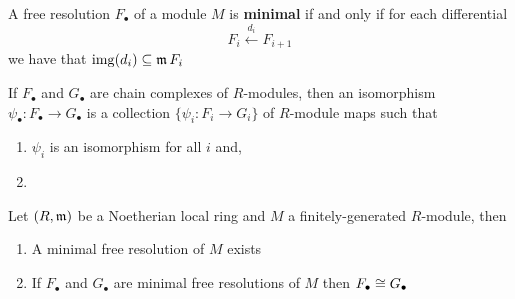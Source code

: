 \documentclass[12pt]{amsart}
\begin{document}
\begin{definition}
    A free resolution $F_\bullet$ of a module $M$ is \textbf{minimal} if and only if for each differential
    \[F_i \xleftarrow{d_i} F_{i+1}\]
    we have that $\operatorname{img}(d_i) \subseteq \operatorname{\mathfrak{m}} F_i$
\end{definition}

\begin{definition}
    If $F_\bullet$ and $G_\bullet$ are chain complexes of $R$-modules, then an isomorphism $\psi_\bullet: F_\bullet \to G_\bullet$ is a collection $\{\psi_i: F_i \to G_i\}$ of $R$-module maps such that 
    \begin{enumerate}
        \item $\psi_i$ is an isomorphism for all $i$ and,
        \item {}
    \end{enumerate}
\end{definition}

\begin{theorem}
    Let $(R, \operatorname{\mathfrak{m}})$ be a Noetherian local ring and $M$ a finitely-generated $R$-module, then
    \begin{enumerate}
        \item A minimal free resolution of $M$ exists 
        \item If $F_\bullet$ and $G_\bullet$ are minimal free resolutions of $M$ then $F_\bullet \cong G_\bullet$
    \end{enumerate}
\end{theorem}
\end{document}
